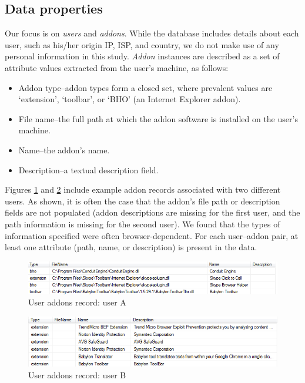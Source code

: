 \documentclass[ijoc,nonblindrev]{informs3} %
\numberwithin{equation}{subsection}
\begin{document}
\subsection{Data properties}

Our focus is on {\it users} and {\it addons}. While the database includes details about each user, such as his/her origin IP, ISP, and country, we do not make use of any personal information in this study. {\it Addon} instances are described as a set of attribute values extracted from the user's machine, as follows:
\begin{itemize}
\item Addon type--addon types form a closed set, where prevalent values are `extension', `toolbar', or `BHO' (an Internet Explorer addon).
\item File name--the full path at which the addon software is installed on the user's machine. 
\item Name--the addon's name. 
\item Description--a textual description field. 
\end{itemize}
Figures \ref{fig:db_addons_snapshot} and \ref{fig:db_addons_snapshot_desc} include example addon records associated with two different users. As shown, it is often the case that the addon's file path or description fields are not populated (addon descriptions are missing for the first user, and the path information is missing for the second user). We found that the types of information specified were often browser-dependent. For each user--addon pair, at least one attribute (path, name, or description) is present in the data.

\begin{figure}[t]
\centering
\includegraphics[angle=0]{figures/db_addons_snapshot.png}
\caption{User addons record: user A}
\label{fig:db_addons_snapshot}
\end{figure}

\begin{figure}[t]
\centering
\includegraphics[angle=0]{figures/db_addons_snapshot_desc.png}
\caption{User addons record: user B}
\label{fig:db_addons_snapshot_desc}
\end{figure}
\end{document}

